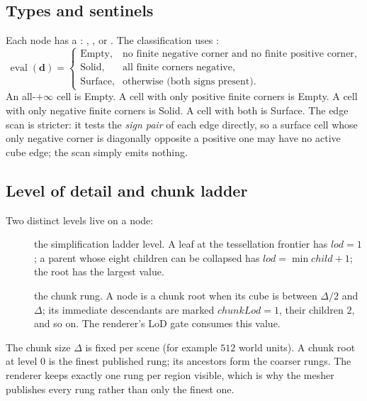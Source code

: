 \subsection{Types and sentinels}

Each node has a : , , or
.  The classification uses :
\begin{equation}
  \operatorname{eval}(\mathbf{d}) =
  \begin{cases}
    \text{Empty}, & \text{no finite negative corner and no finite positive corner},\\
    \text{Solid}, & \text{all finite corners negative},\\
    \text{Surface}, & \text{otherwise (both signs present)}.
  \end{cases}
\end{equation}
An all-$+\infty$ cell is Empty.  A cell with only positive finite corners
is Empty.  A cell with only negative finite corners is Solid.  A cell with
both is Surface.  The edge scan is stricter: it tests the \emph{sign pair}
of each edge directly, so a surface cell whose only negative corner is
diagonally opposite a positive one may have no active cube edge; the scan
simply emits nothing.

\subsection{Level of detail and chunk ladder}

Two distinct levels live on a node:
\begin{description}
\item[] the simplification ladder level.  A leaf at the
  tessellation frontier has $lod=1$; a parent whose eight children can be
  collapsed has $lod=\min child + 1$; the root has the largest value.
\item[] the chunk rung.  A node is a chunk root when its
  cube is between $\Delta/2$ and $\Delta$; its immediate descendants are
  marked $chunkLod=1$, their children $2$, and so on.  The renderer's LoD
  gate consumes this value.
\end{description}
The chunk size $\Delta$ is fixed per scene (for example $512$ world
units).  A chunk root at level 0 is the finest published rung; its
ancestors form the coarser rungs.  The renderer keeps exactly one rung per
region visible, which is why the mesher publishes every rung rather than
only the finest one.

